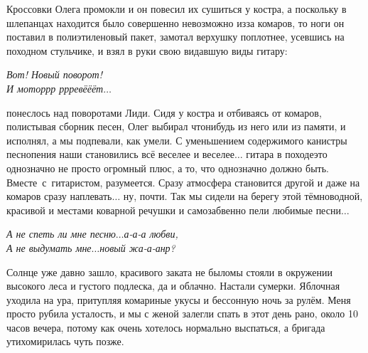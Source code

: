 Кроссовки Олега промокли и он повесил их сушиться у костра, а поскольку в шлепанцах находится было совершенно невозможно из\sdash за комаров, то ноги он поставил в полиэтиленовый пакет, замотал верхушку поплотнее, усевшись на походном стульчике, и взял в руки свою видавшую виды гитару:

\vspace{0.1cm}
\noindent\textit{%
	\hspace*{3.5cm}Вот! Новый поворот!\\
	\hspace*{3.5cm}И мотор\sdash р\sdash р  р\sdash р\sdash ревё\sdash ё\sdash ёт$\ldots$
}
\vspace{0.1cm}

\noindent\mdash понеслось над поворотами Лиди. Сидя у костра и отбиваясь от комаров, полистывая сборник песен, Олег выбирал что\sdash нибудь из него или из памяти, и исполнял, а мы подпевали, как умели. С уменьшением содержимого канистры песнопения наши становились всё веселее и веселее$\ldots$ гитара в походе\mdash это однозначно не просто огромный плюс, а то, что однозначно должно быть. Вместе~с~гитаристом, разумеется. Сразу атмосфера становится другой и даже на комаров сразу наплевать$\ldots$ ну, почти. Так мы сидели на берегу этой тёмноводной, красивой и местами коварной речушки и самозабвенно пели любимые песни$\ldots$

\vspace{0.1cm}
\noindent\textit{%
	\hspace*{2.0cm}А не спеть ли мне песню$\ldots$а-а-а любви,\\
	\hspace*{2.0cm}А не выдумать мне$\ldots$новый жа-а-анр?
}

Солнце уже давно зашло, красивого заката не было\mdash мы стояли в окружении высокого леса и густого подлеска, да и облачно. Настали сумерки. Яблочная уходила на ура, притупляя комариные укусы и бессонную ночь за рулём. Меня просто рубила усталость, и мы с женой залегли спать в этот день рано, около 10 часов вечера, потому как очень хотелось нормально выспаться, а бригада утихомирилась чуть позже.

\begin{center}
\end{center}

